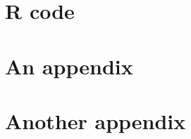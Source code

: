 \documentclass[english, 11pt]{article}\usepackage[]{graphicx}\usepackage[]{color}
\begin{document}
\section{R code}

%




\appendix
\section{An appendix}


\section{Another appendix}


\end{document}
